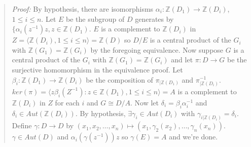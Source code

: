 \begin{quote}
\emph{Proof:}
By hypothesis, there are isomorphisms
$\alpha_i : {\mathbb Z}( D_1 ) \rightarrow {\mathbb Z}( D_i )$, $1 \le i \le n$.
Let $E$ be the subgroup of $D$ generates by $\{ \alpha_i (z^{-1})z, z \in {\mathbb Z}(D_1 )$.
$E$ is a complement to ${\mathbb Z}(D_i)$ in $Z= \langle {\mathbb Z}(D_i), 1 \le i \le n \rangle = {\mathbb Z}(D)$ so
$D/E$ is a central product of the $G_i$ with ${\mathbb Z}(G_1 ) = {\mathbb Z}(G_i )$ by
the foregoing equivalence.  Now suppose $G$ is a central product of the $G_i$ with
${\mathbb Z}(G_1 ) = {\mathbb Z}(G_i )$ and let $\pi: D \rightarrow G$ be the surjective
homomorphism in the equivalence proof.  Let $\beta_i : {\mathbb Z}(D_1 ) \rightarrow {\mathbb Z}(D_i )$ be the composition of
$\pi_{|{\mathbb Z}(D_1 )}$ and $\pi_{|{\mathbb Z}(D_i )}^{-1}$.
$ker(\pi ) = \langle z \beta_i(Z^{-1} ): z \in {\mathbb Z}(D_1 ), 1 \le i \le n \rangle
= A$ is a complement
to ${\mathbb Z}(D_i )$ in $Z$ for each $i$ and $G \cong D/A$.  Now let $\delta_i = \beta_i \alpha_i^{-1}$ and $\delta_i \in Aut({\mathbb Z}(D_i ))$.  By
hypothesis, $\exists \gamma_i \in Aut( D_i )$ with $\gamma_{i | {\mathbb Z}(D_i )}= \delta_i$.
Define $\gamma : D \rightarrow D$ by $(x_1 , x_2 , \ldots , x_n ) \mapsto
(x_1 , \gamma_2(x_2), \ldots , \gamma_n(x_n))$.  $\gamma \in Aut(D)$ and
$\alpha_i(\gamma (z^{-1})) z$ so $\gamma(E)=A$ and we're done.
\end{quote}
